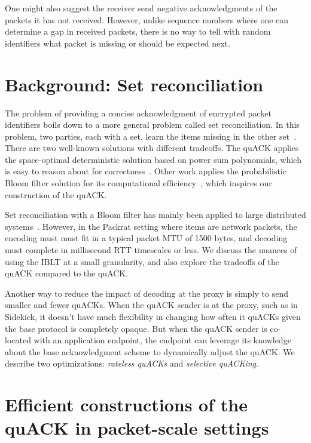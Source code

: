 \smallskip

One might also suggest the receiver send negative acknowledgments of the packets
it has not received. However, unlike sequence numbers where one can
determine a gap in received packets, there is no way to tell with random
identifiers what packet is missing or should be expected next.

\section{Background: Set reconciliation}
\label{sec:quack:background}

The problem of providing a concise acknowledgment of encrypted packet identifiers
boils down to a more general problem called set reconciliation. In this problem,
two parties, each with a set, learn the items missing in the other
set~\cite{minsky2003set,eppstein2011straggler}.
There are two well-known solutions with different tradeoffs. The quACK
applies the space-optimal deterministic solution based on
power sum polynomials, which is easy to reason about for correctness~\cite{yuan2024sidekick}.
Other work applies the probabilistic Bloom filter solution
for its computational efficiency~\cite{yang2024practical,summermatter2021byzantine},
which inspires our construction of the quACK.

Set reconciliation with a Bloom filter has mainly been applied to large distributed systems~\cite
{yang2024practical,summermatter2021byzantine}. However, in the Packrat setting
where items are network packets, the encoding must must fit in a typical packet
MTU of 1500 bytes, and decoding must complete in millisecond RTT timescales or
less. We discuss the nuances of using the IBLT at a small granularity, and
also explore the tradeoffs of the quACK compared to the quACK.

Another way to reduce the impact of decoding at the proxy is simply to send smaller
and fewer quACKs. When the quACK sender is at the proxy, such as in Sidekick,
it doesn't have much flexibility in changing how often it quACKs given
the base protocol is completely opaque. But when the quACK sender is co-located
with an application endpoint, the endpoint can leverage its knowledge about the
base acknowledgment scheme to dynamically adjust the quACK.
We describe two optimizations: \textit{rateless quACKs} and \textit{selective quACKing}.


\section{Efficient constructions of the quACK in packet-scale settings}
\label{sec:quack:constructions}

